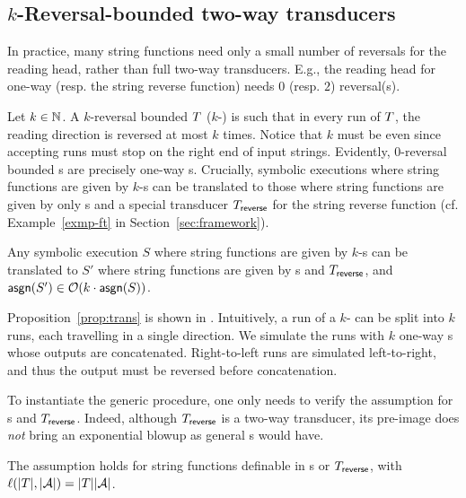 
\subsection{$k$-Reversal-bounded two-way transducers} \label{subsec:krb}
 
In practice, many string functions need only a small number of reversals for the reading head, rather than full two-way transducers. 
E.g., the reading head for one-way \PT{} (resp. the string reverse function) needs $0$ (resp. $2$) reversal(s).

Let $k \in \mathbb{N}$. A $k$-reversal bounded \PPT{} $T$ ($k$-\RBPPT{}) is such that in every run of $T$, the reading direction is reversed at most $k$ times. 
Notice that $k$ must be even since accepting runs must stop on the right end of input strings. 
Evidently, $0$-reversal bounded \PPT{}s are precisely one-way \PT{}s.   
Crucially, symbolic executions where string functions are given by $k$-\RBPPT{}s can be translated to those where string functions are given by only \PT{}s and a special transducer $T_{\sf reverse}$ for the string reverse function  (cf. Example~\ref{exmp-ft} in Section~\ref{sec:framework}).  

\begin{proposition} \label{prop:trans}
	Any symbolic execution $S$ where string functions are given by $k$-\RBPPT{}s can be translated to $S'$ where string functions are given by \PT{}s and $T_{\sf reverse}$, and $ \mathsf{asgn}(S')\in \mathcal{O}(k\cdot \mathsf{asgn}(S))$. 
\end{proposition}

Proposition~\ref{prop:trans} is shown in
.
Intuitively, a run of a $k$-\RBPPT{} can be split into $k$ runs, each travelling in a single direction.
We simulate the runs with $k$ one-way \PT{}s whose outputs are concatenated.
Right-to-left runs are simulated left-to-right, and thus the output must be reversed before concatenation.


To instantiate the generic procedure, one only needs to verify the  \prerec{} assumption for \PT{}s and $T_{\sf reverse}$. Indeed, although $T_{\sf reverse}$ is a two-way transducer, its pre-image does \emph{not} bring an exponential blowup as general \PPT{}s would have. 

\begin{lemma}\label{lem-1pt}
	The \prerec{} assumption holds for string functions definable in \PT{}s or $T_{\sf reverse}$, with $\ell(|T|, |\mathcal{A}|) = |T||\mathcal{A}|$.
\end{lemma}

